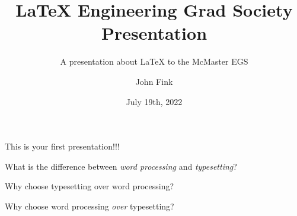 \documentclass{beamer}
\title{\LaTeX{} Engineering Grad Society Presentation}
\subtitle{A presentation about \LaTeX{} to the McMaster EGS}
\author{John Fink}
\institute{McMaster University}
\date{July 19th, 2022}
\begin{document}
	\begin{frame}
		\titlepage
	\end{frame}
	\begin{frame}
		This is your first presentation!!!
	\end{frame}
\begin{frame}
	What is the difference between \textit{word processing} and \textit{typesetting}?
\end{frame}

\begin{frame}
	Why choose typesetting over word processing?
\end{frame}

\begin{frame}
	Why choose word processing \textit{over} typesetting?
\end{frame}


\begin{frame}
	
\end{frame}
	
\end{document}
